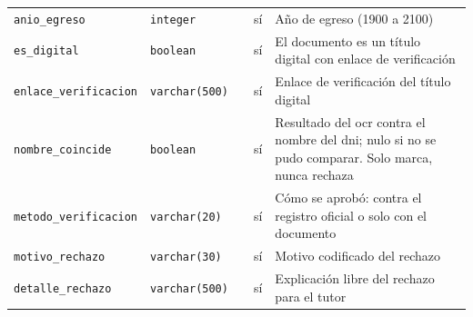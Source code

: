 {\begin{xltabular}{\textwidth}{@{}>{\raggedright\arraybackslash}p{3.6cm} >{\raggedright\arraybackslash}p{2.3cm} >{\raggedright\arraybackslash}p{1cm} >{\centering\arraybackslash}p{0.85cm} L@{}}
    \texttt{anio\_\allowbreak{}egreso} & \texttt{integer} &  & sí & Año de egreso (1900 a 2100) \\
    \texttt{es\_\allowbreak{}digital} & \texttt{boolean} &  & sí & El documento es un título digital con enlace de verificación \\
    \texttt{enlace\_\allowbreak{}verificacion} & \texttt{varchar(\allowbreak{}500)} &  & sí & Enlace de verificación del título digital \\
    \texttt{nombre\_\allowbreak{}coincide} & \texttt{boolean} &  & sí & Resultado del \gls{ocr} contra el nombre del \gls{dni}; nulo si no se pudo comparar. Solo marca, nunca rechaza \\
    \texttt{metodo\_\allowbreak{}verificacion} & \texttt{varchar(\allowbreak{}20)} &  & sí & Cómo se aprobó: contra el registro oficial o solo con el documento \\
    \texttt{motivo\_\allowbreak{}rechazo} & \texttt{varchar(\allowbreak{}30)} &  & sí & Motivo codificado del rechazo \\
    \texttt{detalle\_\allowbreak{}rechazo} & \texttt{varchar(\allowbreak{}500)} &  & sí & Explicación libre del rechazo para el tutor \\
\end{xltabular}
}


